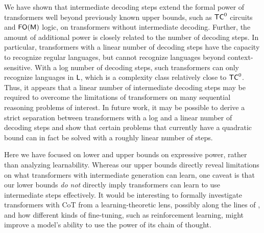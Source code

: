 \documentclass{article}
\begin{document}
We have shown that intermediate decoding steps extend the formal power of transformers well beyond previously known upper bounds, such as $\mathsf{TC}^0$ circuits and $\mathsf{FO(M)}$ logic, on transformers without intermediate decoding. Further, the amount of additional power is closely related to the number of decoding steps. In particular, transformers with a linear number of decoding steps have the capacity to recognize regular languages, but cannot recognize languages beyond context-sensitive. With a log number of decoding steps, such transformers can only recognize languages in $\mathsf L$, which is a complexity class relatively close to $\mathsf{TC}^0$. Thus, it appears that a linear number of intermediate decoding steps may be required to overcome the limitations of transformers on many sequential reasoning problems of interest.
In future work, it may be possible to derive a strict separation between transformers with a log and a linear number of decoding steps and show that certain problems that currently have a quadratic bound can in fact be solved with a roughly linear number of steps.


Here we have focused on lower and upper bounds on expressive power, rather than analyzing learnability. 
Whereas our upper bounds directly reveal limitations on what transformers with intermediate generation can learn, one caveat is that our lower bounds \emph{do not} directly imply transformers can learn to use intermediate steps effectively.
It would be interesting to formally investigate transformers with CoT from a learning-theoretic lens, possibly along the lines of \citet{malach2023autoregressive}, and how different kinds of fine-tuning, such as reinforcement learning, might improve a model's ability to use the power of its chain of thought.

\end{document}
